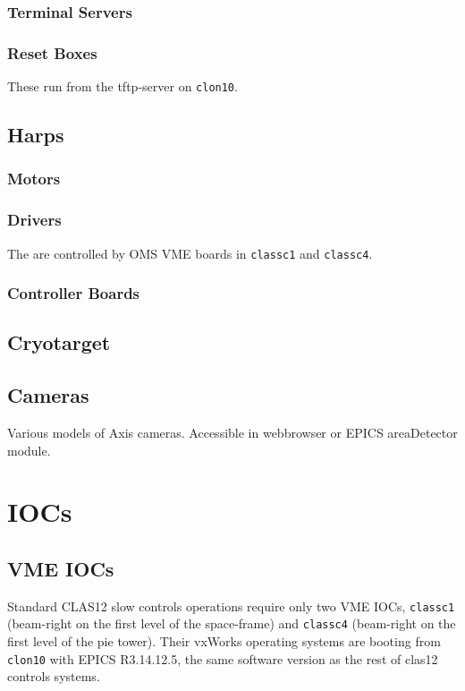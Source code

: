 \documentclass[amsmath,amssymb,notitlepage,11pt]{revtex4}
\begin{document}
\subsubsection{Terminal Servers}
\subsubsection{Reset Boxes}
These run from the tftp-server on \texttt{clon10}.

\subsection{Harps}
\subsubsection{Motors}
\subsubsection{Drivers}
The are controlled by OMS VME boards in \texttt{classc1} and \texttt{classc4}.
\subsubsection{Controller Boards}

\subsection{Cryotarget}

\subsection{Cameras}
Various models of Axis cameras.  Accessible in webbrowser or EPICS areaDetector module.

\section{IOCs}

\subsection{VME IOCs}
Standard CLAS12 slow controls operations require only two VME IOCs, \texttt{classc1} (beam-right on the first level of the space-frame) and \texttt{classc4} (beam-right on the first level of the pie tower).  Their vxWorks operating systems are booting from \texttt{clon10} with EPICS R3.14.12.5, the same software version as the rest of clas12 controls systems.
\end{document}
